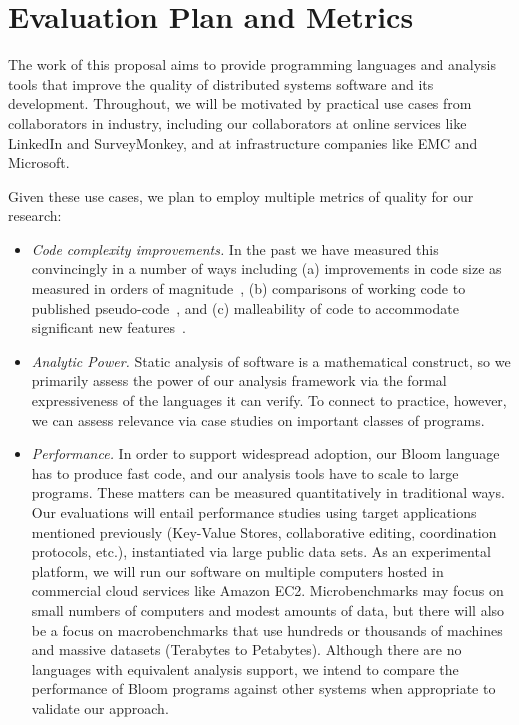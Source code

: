 \section{Evaluation Plan and Metrics}
The work of this proposal aims to provide programming languages and analysis tools that improve the quality of distributed systems software and its development.  Throughout, we will be motivated by practical use cases from collaborators in industry, including our collaborators at online services like LinkedIn and SurveyMonkey, and at infrastructure companies like EMC and Microsoft.

Given these use cases, we plan to employ multiple metrics of quality for our research: 
\begin{itemize}
\item \emph{Code complexity improvements.}  In the past we have measured this convincingly in a number of ways including (a) improvements in code size as measured in orders of magnitude~\cite{boom-eurosys,p2}, (b) comparisons of working code to published pseudo-code~\cite{boom-eurosys,netdb}, and (c) malleability of code to accommodate significant new features~\cite{boom-eurosys}.  

\item \emph{Analytic Power.}  Static analysis of software is a mathematical construct, so we primarily assess the power of our analysis framework via the formal expressiveness of the languages it can verify.  To connect to practice, however, we can assess relevance via case studies on important classes of programs.

\item \emph{Performance.}  In order to support widespread adoption, our Bloom language has to produce fast code, and our analysis tools have to scale to large programs.  These matters can be measured quantitatively in  traditional ways.  Our evaluations will entail performance studies using target applications mentioned previously  (Key-Value Stores, collaborative editing, coordination protocols, etc.), instantiated via large public data sets.  As an experimental platform, we will run our software on multiple computers hosted in commercial cloud services like Amazon EC2.  Microbenchmarks may focus on small numbers of computers and modest amounts of data, but there will also be a focus on macrobenchmarks that use hundreds or thousands of machines and massive datasets (Terabytes to Petabytes).  Although there are no languages with equivalent analysis support, we intend to compare the performance of Bloom programs against other systems when appropriate to validate our approach. 
\end{itemize}

